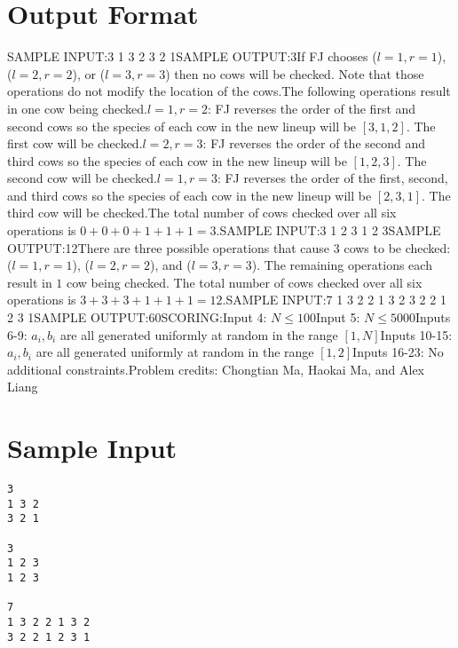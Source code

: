 \documentclass[12pt]{article}
\begin{document}
\section*{Output Format}
SAMPLE INPUT:3
1 3 2
3 2 1SAMPLE OUTPUT:3If FJ chooses ($l=1,r=1$), ($l=2,r=2$), or ($l=3,r=3$) then no cows will be
checked. Note that those operations do not modify the location of the cows.The following operations result in one cow being checked.$l=1,r=2$: FJ reverses the order of the first and second cows so the species
of each cow in the new lineup will be $[3,1,2]$. The first cow will be checked.$l=2,r=3$: FJ reverses the order of the second and third cows so the species
of each cow in the new lineup will be $[1,2,3]$. The second cow will be checked.$l=1,r=3$: FJ reverses the order of the first, second, and third cows so the
species of each cow in the new lineup will be $[2,3,1]$. The third cow will be
checked.The total number of cows checked over all six operations is $0+0+0+1+1+1=3$.SAMPLE INPUT:3
1 2 3
1 2 3SAMPLE OUTPUT:12There are three possible operations that cause $3$ cows to be checked:
($l=1,r=1$), ($l=2,r=2$), and ($l=3,r=3$). The remaining operations each result
in $1$ cow being checked. The total number of cows checked over all six
operations is $3+3+3+1+1+1=12$.SAMPLE INPUT:7
1 3 2 2 1 3 2
3 2 2 1 2 3 1SAMPLE OUTPUT:60SCORING:Input 4: $N\le 100$Input 5: $N\le 5000$Inputs 6-9: $a_i, b_i$ are all generated uniformly at random in the range
$[1,N]$Inputs 10-15: $a_i, b_i$ are all generated uniformly at random in the range
$[1,2]$Inputs 16-23: No additional constraints.Problem credits: Chongtian Ma, Haokai Ma, and Alex Liang

\section*{Sample Input}
\begin{verbatim}
3
1 3 2
3 2 1

3
1 2 3
1 2 3

7
1 3 2 2 1 3 2
3 2 2 1 2 3 1
\end{verbatim}
\end{document}
